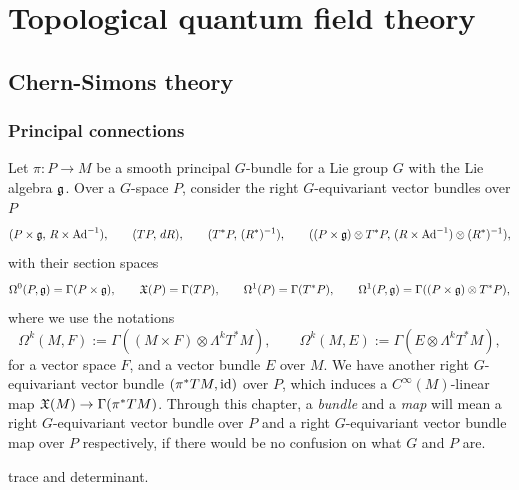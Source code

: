 \documentclass{../../large}
\begin{document}
\part{Topological quantum field theory}
\chapter{Chern-Simons theory}

\section{Principal connections}

\begin{prb}
Let $\pi:P\to M$ be a smooth principal $G$-bundle for a Lie group $G$ with the Lie algebra $\mathfrak{g}$.
Over a $G$-space $P$, consider the right $G$-equivariant vector bundles over $P$
\[(P\times\mathfrak{g},\,R\times\operatorname{Ad}^{-1}),\qquad(TP,\,dR),\qquad(T^*P,\,(R^*)^{-1}),\qquad((P\times\mathfrak{g})\otimes T^*P,\,(R\times\operatorname{Ad}^{-1})\otimes(R^*)^{-1}),\]
with their section spaces
\[\Omega^0(P,\mathfrak{g})=\Gamma(P\times\mathfrak{g}),\qquad\mathfrak{X}(P)=\Gamma(TP),\qquad\Omega^1(P)=\Gamma(T^*P),\qquad\Omega^1(P,\mathfrak{g})=\Gamma((P\times\mathfrak{g})\otimes T^*P),\]
where we use the notations
\[\Omega^k(M,F):=\Gamma((M\times F)\otimes\Lambda^kT^*M),\qquad\Omega^k(M,E):=\Gamma(E\otimes\Lambda^kT^*M),\]
for a vector space $F$, and a vector bundle $E$ over $M$.
We have another right $G$-equivariant vector bundle $(\pi^*TM,\operatorname{id})$ over $P$, which induces a $C^\infty(M)$-linear map $\mathfrak{X}(M)\to\Gamma(\pi^*TM)$.
Through this chapter, a \emph{bundle} and a \emph{map} will mean a right $G$-equivariant vector bundle over $P$ and a right $G$-equivariant vector bundle map over $P$ respectively, if there would be no confusion on what $G$ and $P$ are.
\end{prb}

trace and determinant.
\end{document}
